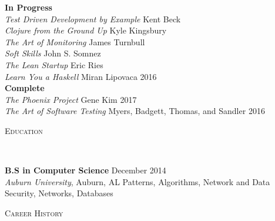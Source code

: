 \documentclass[9pt]{article}
\newenvironment{changemargin}[2]{%
  \begin{list}{}{%
    \setlength{\topsep}{0pt}%
    \setlength{\leftmargin}{#1}%
    \setlength{\rightmargin}{#2}%
    \setlength{\listparindent}{\parindent}%
    \setlength{\itemindent}{\parindent}%
    \setlength{\parsep}{\parskip}%
  }%
  \item[]}{\end{list}
}
\newcommand{\lineover}{
	\begin{changemargin}{-0.05in}{-0.05in}
		\vspace*{-8pt}
		\hrulefill \\
		\vspace*{-2pt}
	\end{changemargin}
}
\newcommand{\header}[1]{
	\begin{changemargin}{-0.5in}{-0.5in}
		\scshape{#1}\\
  	\lineover
	\end{changemargin}
}
\newenvironment{body} {
	\vspace*{-16pt}
	\begin{changemargin}{-0.25in}{-0.5in}
  }	
	{\end{changemargin}
}
\begin{document}
\begin{body}
	\vspace{17pt}
	\textbf{In Progress}\\
	\emph{Test Driven Development by Example} Kent Beck\\
	\emph{Clojure from the Ground Up} Kyle Kingsbury\\
	\emph{The Art of Monitoring} James Turnbull\\
	\emph{Soft Skills} John S. Somnez\\
	\emph{The Lean Startup} Eric Ries\\
	\emph{Learn You a Haskell} Miran Lipovaca \hfill{} 2016\\
	\textbf{Complete}\\
	\emph{The Phoenix Project} Gene Kim \hfill{} 2017\\
	\emph{The Art of Software Testing} Myers, Badgett, Thomas, and Sandler \hfill{} 2016
\end{body}

\header{Education}

\begin{body}
	\vspace{17pt}
	\textbf{B.S in Computer Science}{} \hfill December 2014{} \\
	\emph{Auburn University}, Auburn, AL{} %
	\hspace{4ex} Patterns, Algorithms, Network and Data Security, Networks, Databases
\end{body}

\smallskip


\header{Career History}
\end{document}
